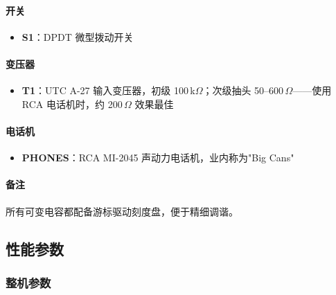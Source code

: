 \paragraph{开关}

\begin{itemize}[leftmargin=2cm]
    \item \textbf{S1}：DPDT 微型拨动开关
\end{itemize}

\paragraph{变压器}

\begin{itemize}[leftmargin=2cm]
    \item \textbf{T1}：UTC A-27 输入变压器，初级 100\,k$\Omega$；次级抽头 50--600\,$\Omega$——使用 RCA 电话机时，约 200\,$\Omega$ 效果最佳
\end{itemize}

\paragraph{电话机}

\begin{itemize}[leftmargin=2cm]
    \item \textbf{PHONES}：RCA MI-2045 声动力电话机，业内称为"Big Cans"
\end{itemize}

\paragraph{备注}

所有可变电容都配备游标驱动刻度盘，便于精细调谐。

\subsection{性能参数}
\label{subsec:lyonodyne_performance}

\subsubsection*{整机参数}

